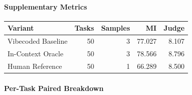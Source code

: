 \paragraph{Supplementary Metrics}

\begin{table}[t]
\centering
\label{tab:specoracle-comparison}
\begin{tabular}{lrrrr}
\hline
Variant & Tasks & Samples & MI & Judge \\
\hline
Vibecoded Baseline & 50 & 3 & 77.027 & 8.107 \\
In-Context Oracle & 50 & 3 & 78.566 & 8.796 \\
Human Reference & 50 & 1 & 66.289 & 8.500 \\
\hline
\end{tabular}
\end{table}

\paragraph{Per-Task Paired Breakdown}

